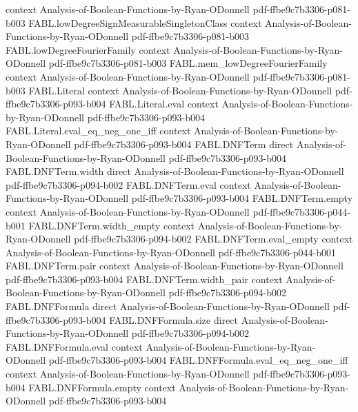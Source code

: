 \begin{theorem}
  {context}
  {Analysis-of-Boolean-Functions-by-Ryan-ODonnell}
  {pdf-ffbe9c7b3306-p081-b003}
\proofstep
  {FABL.lowDegreeSignMeasurableSingletonClass}
  {context}
  {Analysis-of-Boolean-Functions-by-Ryan-ODonnell}
  {pdf-ffbe9c7b3306-p081-b003}
\proofstep
  {FABL.lowDegreeFourierFamily}
  {context}
  {Analysis-of-Boolean-Functions-by-Ryan-ODonnell}
  {pdf-ffbe9c7b3306-p081-b003}
\proofstep
  {FABL.mem_lowDegreeFourierFamily}
  {context}
  {Analysis-of-Boolean-Functions-by-Ryan-ODonnell}
  {pdf-ffbe9c7b3306-p081-b003}
\proofstep
  {FABL.Literal}
  {context}
  {Analysis-of-Boolean-Functions-by-Ryan-ODonnell}
  {pdf-ffbe9c7b3306-p093-b004}
\proofstep
  {FABL.Literal.eval}
  {context}
  {Analysis-of-Boolean-Functions-by-Ryan-ODonnell}
  {pdf-ffbe9c7b3306-p093-b004}
\proofstep
  {FABL.Literal.eval_eq_neg_one_iff}
  {context}
  {Analysis-of-Boolean-Functions-by-Ryan-ODonnell}
  {pdf-ffbe9c7b3306-p093-b004}
\proofstep
  {FABL.DNFTerm}
  {direct}
  {Analysis-of-Boolean-Functions-by-Ryan-ODonnell}
  {pdf-ffbe9c7b3306-p093-b004}
\proofstep
  {FABL.DNFTerm.width}
  {direct}
  {Analysis-of-Boolean-Functions-by-Ryan-ODonnell}
  {pdf-ffbe9c7b3306-p094-b002}
\proofstep
  {FABL.DNFTerm.eval}
  {context}
  {Analysis-of-Boolean-Functions-by-Ryan-ODonnell}
  {pdf-ffbe9c7b3306-p093-b004}
\proofstep
  {FABL.DNFTerm.empty}
  {context}
  {Analysis-of-Boolean-Functions-by-Ryan-ODonnell}
  {pdf-ffbe9c7b3306-p044-b001}
\proofstep
  {FABL.DNFTerm.width_empty}
  {context}
  {Analysis-of-Boolean-Functions-by-Ryan-ODonnell}
  {pdf-ffbe9c7b3306-p094-b002}
\proofstep
  {FABL.DNFTerm.eval_empty}
  {context}
  {Analysis-of-Boolean-Functions-by-Ryan-ODonnell}
  {pdf-ffbe9c7b3306-p044-b001}
\proofstep
  {FABL.DNFTerm.pair}
  {context}
  {Analysis-of-Boolean-Functions-by-Ryan-ODonnell}
  {pdf-ffbe9c7b3306-p093-b004}
\proofstep
  {FABL.DNFTerm.width_pair}
  {context}
  {Analysis-of-Boolean-Functions-by-Ryan-ODonnell}
  {pdf-ffbe9c7b3306-p094-b002}
\proofstep
  {FABL.DNFFormula}
  {direct}
  {Analysis-of-Boolean-Functions-by-Ryan-ODonnell}
  {pdf-ffbe9c7b3306-p093-b004}
\proofstep
  {FABL.DNFFormula.size}
  {direct}
  {Analysis-of-Boolean-Functions-by-Ryan-ODonnell}
  {pdf-ffbe9c7b3306-p094-b002}
\proofstep
  {FABL.DNFFormula.eval}
  {context}
  {Analysis-of-Boolean-Functions-by-Ryan-ODonnell}
  {pdf-ffbe9c7b3306-p093-b004}
\proofstep
  {FABL.DNFFormula.eval_eq_neg_one_iff}
  {context}
  {Analysis-of-Boolean-Functions-by-Ryan-ODonnell}
  {pdf-ffbe9c7b3306-p093-b004}
\proofstep
  {FABL.DNFFormula.empty}
  {context}
  {Analysis-of-Boolean-Functions-by-Ryan-ODonnell}
  {pdf-ffbe9c7b3306-p093-b004}

\end{theorem}
